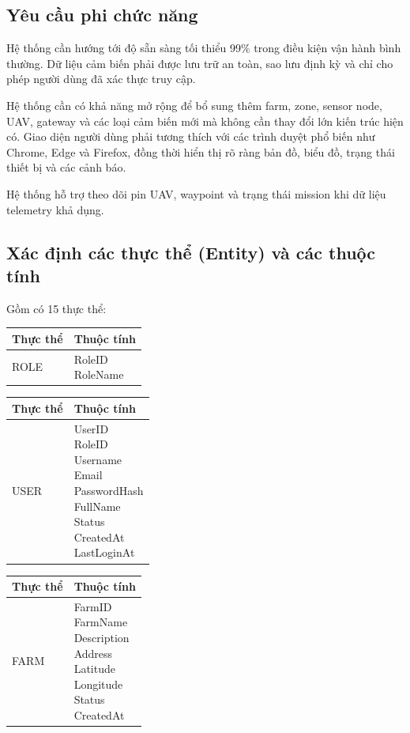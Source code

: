 \subsection{Yêu cầu phi chức năng}
Hệ thống cần hướng tới độ sẵn sàng tối thiểu 99\% trong điều kiện vận hành bình thường. Dữ liệu cảm biến phải được lưu trữ an toàn, sao lưu định kỳ và chỉ cho phép người dùng đã xác thực truy cập.

Hệ thống cần có khả năng mở rộng để bổ sung thêm farm, zone, sensor node, UAV, gateway và các loại cảm biến mới mà không cần thay đổi lớn kiến trúc hiện có. Giao diện người dùng phải tương thích với các trình duyệt phổ biến như Chrome, Edge và Firefox, đồng thời hiển thị rõ ràng bản đồ, biểu đồ, trạng thái thiết bị và các cảnh báo.

Hệ thống hỗ trợ theo dõi pin UAV, waypoint và trạng thái mission khi dữ liệu telemetry khả dụng.

\subsection{Xác định các thực thể (Entity) và các thuộc tính}
Gồm có 15 thực thể:
\begin{longtable}{p{}p{}}
\toprule
\textbf{Thực thể} & \textbf{Thuộc tính} \\
\midrule
ROLE & \makecell[l]{RoleID \\ RoleName} \\
\bottomrule
\end{longtable}

    

\begin{longtable}{p{}p{}}
\toprule
\textbf{Thực thể} & \textbf{Thuộc tính} \\
\midrule
USER & \makecell[l]{UserID \\ RoleID \\ Username \\ Email \\ PasswordHash \\ FullName \\ Status \\ CreatedAt \\ LastLoginAt} \\
\bottomrule
\end{longtable}


\begin{longtable}{p{}p{}}
\toprule
\textbf{Thực thể} & \textbf{Thuộc tính} \\
\midrule
FARM & \makecell[l]{FarmID \\FarmName \\Description \\Address \\Latitude \\Longitude \\Status \\CreatedAt} \\
\bottomrule
\end{longtable}


